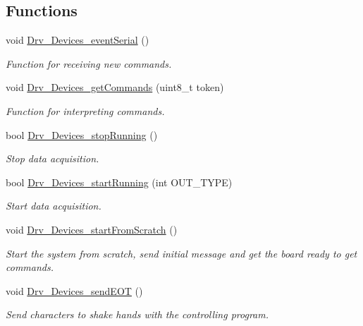 \subsection*{Functions}
\begin{DoxyCompactItemize}
\item 
void \hyperlink{group___devices___library_ga8092c357f91843e6fa9db02735addc7d}{Drv\+\_\+\+Devices\+\_\+event\+Serial} ()
\begin{DoxyCompactList}\small\item\em Function for receiving new commands. \end{DoxyCompactList}\item 
void \hyperlink{group___devices___library_gafb56f6b90c50e36cd6e34665d85fb903}{Drv\+\_\+\+Devices\+\_\+get\+Commands} (uint8\+\_\+t token)
\begin{DoxyCompactList}\small\item\em Function for interpreting commands. \end{DoxyCompactList}\item 
bool \hyperlink{group___devices___library_ga8584f49a773b7e9add0e51bb0057fb54}{Drv\+\_\+\+Devices\+\_\+stop\+Running} ()
\begin{DoxyCompactList}\small\item\em Stop data acquisition. \end{DoxyCompactList}\item 
bool \hyperlink{group___devices___library_ga7f4ddcd86724d8aad896ff12e43146ca}{Drv\+\_\+\+Devices\+\_\+start\+Running} (int O\+U\+T\+\_\+\+T\+Y\+P\+E)
\begin{DoxyCompactList}\small\item\em Start data acquisition. \end{DoxyCompactList}\item 
void \hyperlink{group___devices___library_ga43e0b770fd7ccd57b3f0d5ddf0eda4be}{Drv\+\_\+\+Devices\+\_\+start\+From\+Scratch} ()
\begin{DoxyCompactList}\small\item\em Start the system from scratch, send initial message and get the board ready to get commands. \end{DoxyCompactList}\item 
void \hyperlink{group___devices___library_ga26ea493ed59bae1e6a0c0af4ece44f40}{Drv\+\_\+\+Devices\+\_\+send\+E\+O\+T} ()
\begin{DoxyCompactList}\small\item\em Send characters to shake hands with the controlling program. \end{DoxyCompactList}\item 

\end{DoxyCompactItemize}

